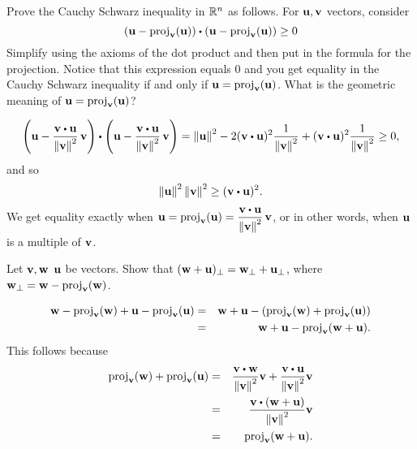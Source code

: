 \begin{ex}
  Prove the Cauchy Schwarz inequality in $\mathbb{R}^n$ as follows.  For
  $\vect{u},\vect{v}$ vectors, consider
  \begin{equation*}
    (\vect{u}-
    \proj_{\vect{v}}(\vect{u})) \dotprod (\vect{u}-
    \proj_{\vect{v}}(\vect{u})) \geq 0
  \end{equation*}
  Simplify using the axioms of the dot product and then put in the
  formula for the projection. Notice that this expression equals $0$
  and you get equality in the Cauchy Schwarz inequality if and only if
  $\vect{u}=\proj_{\vect{v}}(\vect{u})$. What is the geometric
  meaning of $\vect{u}=\proj_{\vect{v}}(\vect{u})$?
  \begin{sol}
    \begin{equation*}
      \paren{\vect{u}-\frac{\vect{v}\dotprod\vect{u}}{\norm{\vect{v}}^2}\,\vect{v}}
      \dotprod
      \paren{\vect{u}-\frac{\vect{v}\dotprod\vect{u}}{\norm{\vect{v}}^2}\,\vect{v}}
      = \norm{\vect{u}}^2 - 2(\vect{v}\dotprod \vect{u})^2\frac{1}{\norm{\vect{v}}^2}+(\vect{v}\dotprod \vect{u})^2\frac{1}{\norm{\vect{v}}^2}
      \geq 0,
    \end{equation*}
    and so
    \begin{equation*}
      \norm{\vect{u}}^2\norm{\vect{v}}^2
      \geq (\vect{v}\dotprod \vect{u})^2.
    \end{equation*}
    We get equality exactly when
    $\displaystyle\vect{u}=\proj_{\vect{v}}(\vect{u}) =
    \frac{\vect{v}\dotprod \vect{u}}{\norm{\vect{v}}^2}\,\vect{v}$,
    or in other words, when $\vect{u}$ is a multiple of $\vect{v}$.
  \end{sol}
\end{ex}

\begin{ex}\label{perp-linear}
  Let $\vect{v},\vect{w}$ $\vect{u}$ be vectors. Show that
  $(\vect{w}+\vect{u})_{\perp}=\vect{w}_{\perp}+\vect{u}_{\perp}$,
  where $\vect{w}_{\perp}=\vect{w}-\proj_{\vect{v}}(\vect{w})$.
  \begin{sol}
    \begin{eqnarray*}
      \vect{w}-\proj_{\vect{v}}(\vect{w})+\vect{u}-\proj_{\vect{v}}(\vect{u})
      &=& \vect{w}+\vect{u}-(\proj_{\vect{v}}(\vect{w})+\proj_{\vect{v}}(\vect{u})) \\
      &=&\vect{w}+\vect{u}-\proj_{\vect{v}}(\vect{w}+\vect{u}).
    \end{eqnarray*}
    This follows because
    \begin{eqnarray*}
      \proj_{\vect{v}}(\vect{w})+\proj_{\vect{v}}(\vect{u})
      &=& \frac{\vect{v}\dotprod\vect{w}}{\norm{\vect{v}}^2}\vect{v}
          + \frac{\vect{v}\dotprod\vect{u}}{\norm{\vect{v}}^2}\vect{v} \\
      &=& \frac{\vect{v}\dotprod(\vect{w}+\vect{u})}{\norm{\vect{v}}^2}\vect{v} \\
      &=& \proj_{\vect{v}}(\vect{w}+\vect{u}).
    \end{eqnarray*}
  \end{sol}
\end{ex}

